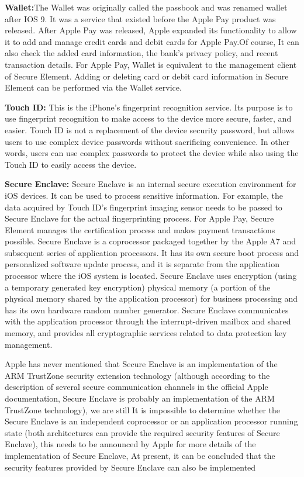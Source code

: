 \documentclass[journal]{IEEEtran}
\begin{document}
    \textbf{Wallet:}The Wallet was originally called the passbook and was renamed wallet after IOS 9. It was a service that existed before the Apple Pay product was released. After Apple Pay was released, Apple expanded its functionality to allow it to add and manage credit cards and debit cards for Apple Pay.Of course, It can also check the added card information, the bank's privacy policy, and recent transaction details. For Apple Pay, Wallet is equivalent to the management client of Secure Element. Adding or deleting card or debit card information in Secure Element can be performed via the Wallet service.
   
    \textbf{Touch ID:} This is the iPhone's fingerprint recognition service. Its purpose is to use fingerprint recognition to make access to the device more secure, faster, and easier. Touch ID is not a replacement of the device security password, but allows users to use complex device passwords without sacrificing convenience. In other words, users can use complex passwords to protect the device while also using the Touch ID to easily access the device.
   
    \textbf{Secure Enclave:} Secure Enclave is an internal secure execution environment for iOS devices. It can be used to process sensitive information. For example, the data acquired by Touch ID's fingerprint imaging sensor needs to be passed to Secure Enclave for the actual fingerprinting process. For Apple Pay, Secure Element manages the certification process and makes payment transactions possible.
    Secure Enclave is a coprocessor packaged together by the Apple A7 and subsequent series of application processors. It has its own secure boot process and personalized software update process, and it is separate from the application processor where the iOS system is located. Secure Enclave uses encryption (using a temporary generated key encryption) physical memory (a portion of the physical memory shared by the application processor) for business processing and has its own hardware random number generator. Secure Enclave communicates with the application processor through the interrupt-driven mailbox and shared memory, and provides all cryptographic services related to data protection key management.


Apple has never mentioned that Secure Enclave is an implementation of the ARM TrustZone security extension technology (although according to the description of several secure communication channels in the official Apple documentation, Secure Enclave is probably an implementation of the ARM TrustZone technology), we are still It is impossible to determine whether the Secure Enclave is an independent coprocessor or an application processor running state (both architectures can provide the required security features of Secure Enclave), this needs to be announced by Apple for more details of the implementation of Secure Enclave, At present, it can be concluded that the security features provided by Secure Enclave can also be implemented
\end{document}
